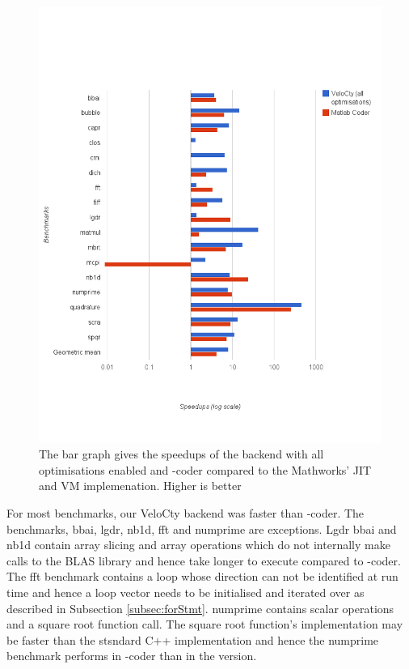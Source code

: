 \begin{figure}[htbp]
\centering
\includegraphics[scale=0.5]{Figures/results_cwochecks.png}
\caption[Experiment results for the baseline \velocty backend for \matlab benchmarks]{The bar graph gives the speedups of the \velocty backend with all optimisations enabled and \matlab-coder compared to the Mathworks' JIT and VM implemenation. Higher is better }
\label{fig:results_cwochecks}
\end{figure}

For most benchmarks, our VeloCty backend was faster than \matlab-coder. The benchmarks, \textsf{bbai}, \textsf{lgdr}, \textsf{nb1d}, \textsf{fft} and \textsf{numprime} are exceptions. \textsf{Lgdr} \textsf{bbai} and \textsf{nb1d} contain array slicing and array operations which do not internally make calls to the BLAS library and hence take longer to execute compared to \matlab-coder. The \textsf{fft} benchmark contains a loop whose direction can not be identified at run time and hence a loop vector needs to be initialised and iterated over as described in Subsection \ref{subsec:forStmt}. \textsf{numprime} contains scalar operations and a square root function call. The square root function's \matlab implementation may be faster than the stsndard C++ implementation and hence the \textsf{numprime} benchmark performs in \matlab-coder than in the \velocty version. 

